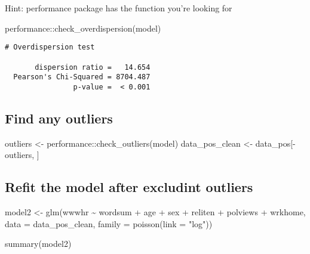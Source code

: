 \documentclass[
  letterpaper,
  DIV=11,
  numbers=noendperiod]{scrartcl}
\newenvironment{Shaded}{\begin{snugshade}}{\end{snugshade}}
\newcommand{\AttributeTok}[1]{\textcolor[rgb]{0.40,0.45,0.13}{#1}}
\newcommand{\FunctionTok}[1]{\textcolor[rgb]{0.28,0.35,0.67}{#1}}
\newcommand{\NormalTok}[1]{\textcolor[rgb]{0.00,0.23,0.31}{#1}}
\newcommand{\OtherTok}[1]{\textcolor[rgb]{0.00,0.23,0.31}{#1}}
\newcommand{\SpecialCharTok}[1]{\textcolor[rgb]{0.37,0.37,0.37}{#1}}
\newcommand{\StringTok}[1]{\textcolor[rgb]{0.13,0.47,0.30}{#1}}
\begin{document}
Hint: performance package has the function you're looking for

\begin{Shaded}
\begin{Highlighting}[]
\NormalTok{performance}\SpecialCharTok{::}\FunctionTok{check\_overdispersion}\NormalTok{(model)}
\end{Highlighting}
\end{Shaded}

\begin{verbatim}
# Overdispersion test

       dispersion ratio =   14.654
  Pearson's Chi-Squared = 8704.487
                p-value =  < 0.001
\end{verbatim}

\subsection{Find any outliers}\label{find-any-outliers}

\begin{Shaded}
\begin{Highlighting}[]
\NormalTok{outliers }\OtherTok{\textless{}{-}}\NormalTok{ performance}\SpecialCharTok{::}\FunctionTok{check\_outliers}\NormalTok{(model)}
\NormalTok{data\_pos\_clean }\OtherTok{\textless{}{-}}\NormalTok{ data\_pos[}\SpecialCharTok{{-}}\NormalTok{outliers, ]}
\end{Highlighting}
\end{Shaded}

\subsection{Refit the model after excludint
outliers}\label{refit-the-model-after-excludint-outliers}

\begin{Shaded}
\begin{Highlighting}[]
\NormalTok{model2 }\OtherTok{\textless{}{-}} \FunctionTok{glm}\NormalTok{(wwwhr }\SpecialCharTok{\textasciitilde{}}\NormalTok{ wordsum }\SpecialCharTok{+}\NormalTok{ age }\SpecialCharTok{+}\NormalTok{ sex }\SpecialCharTok{+}\NormalTok{ reliten }\SpecialCharTok{+}\NormalTok{ polviews }\SpecialCharTok{+}\NormalTok{ wrkhome, }
                           \AttributeTok{data =}\NormalTok{ data\_pos\_clean, }\AttributeTok{family =} \FunctionTok{poisson}\NormalTok{(}\AttributeTok{link =} \StringTok{"log"}\NormalTok{))}

\FunctionTok{summary}\NormalTok{(model2)}
\end{Highlighting}
\end{Shaded}
\end{document}
